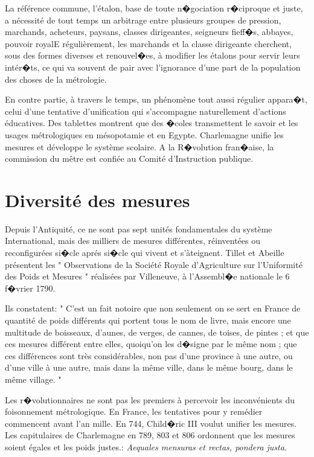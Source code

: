La référence commune, l'étalon, base de toute n�gociation r�ciproque et juste, a nécessité de tout temps un arbitrage entre plusieurs groupes de pression, marchands, acheteurs, paysans, classes dirigeantes, seigneurs fieff�s, abbayes, pouvoir royalE  régulièrement, les marchands et la classe dirigeante cherchent, sous des formes diverses et renouvel�es, à modifier les étalons pour servir leurs intér�ts, ce qui va souvent de pair avec l'ignorance d'une part de la population des choses de la métrologie.

En contre partie, à travers le temps, un phénomène tout aussi régulier appara�t, celui d'une tentative d'unification qui s'accompagne naturellement d'actions éducatives.  Des tablettes montrent que des �coles transmettent le savoir et les usages métrologiques en mésopotamie et en Egypte.  Charlemagne unifie les mesures et développe le système scolaire.  A la R�volution fran�aise, la commission du mêtre est confiée au Comité d'Instruction publique.

\section{Diversité des mesures}

Depuis l'Antiquité, ce ne sont pas sept unités fondamentales du système International, mais des milliers de mesures différentes, réinventées ou reconfigurées si�cle aprés si�cle qui vivent et s'àteignent. Tillet et Abeille présentent les " Observations de la Société Royale d'Agriculture sur l'Uniformité des Poids et Mesures " réalisées par Villeneuve, à l'Assembl�e nationale le 6 f�vrier 1790.

Ils constatent: " C'est un fait notoire que non seulement on se sert en France de quantité de poids différents qui portent tous le nom de livre, mais encore une multitude de boisseaux, d'aunes, de verges, de cannes, de toises, de pintes ; et que ces mesures différent entre elles, quoiqu'on les d�signe par le même nom ; que ces différences sont très considérables, non pas d'une province à une autre, ou d'une ville à une autre, mais dans la même ville, dans le même bourg, dans le même village. "

Les r�volutionnaires ne sont pas les premiers à percevoir les inconvénients du foisonnement métrologique.  En France, les tentatives pour y remédier commencent avant l'an mille.  En 744, Child�ric III voulut unifier les mesures.  Les capitulaires de Charlemagne en 789, 803 et 806 ordonnent que les mesures soient égales et les poids justes.: \textit{Aequales mensuras et rectas, pondera justa}.

